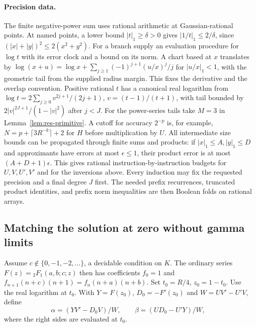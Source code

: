 \paragraph{Precision data.}
The finite negative-power sum uses rational arithmetic at Gaussian-rational
points. At named points, a lower bound $|t|_1\ge\delta>0$ gives
$|1/t|_1\le 2/\delta$, since $(|x|+|y|)^2\le 2(x^2+y^2)$.
For a branch supply an evaluation procedure for $\log t$ with its error
clock and a bound on its norm. A chart based at $x$ translates by
$\log(x+u)=\log x+\sum_{j\ge1}(-1)^{j+1}(u/x)^j/j$ for $|u/x|_1<1$,
with the geometric tail from the supplied radius margin. This fixes the
derivative and the overlap convention. Positive rational $t$ has a canonical real logarithm from
$\log t=2\sum_{j\ge0} v^{2j+1}/(2j+1)$, $v=(t-1)/(t+1)$, with tail
bounded by $2|v|^{2J+1}/(1-|v|^2)$ after $j<J$.
For the power-series tails take $M=3$ in Lemma~\ref{lem:res-primitive}.
A cutoff for accuracy $2^{-p}$ is, for example,
$N=p+\lceil 3 R^{-k}\rceil+2$ for $H$ before multiplication by $U$.
All intermediate size bounds can be propagated through finite sums and
products: if $|x|_1\le A, |y|_1\le D$ and approximants have errors
at most $\epsilon\le1$, their product error is at most
$(A+D+1)\epsilon$. This gives rational instruction-by-instruction budgets
for $U,V,U',V'$ and for the inversions above. Every induction may fix the
requested precision and a final degree $J$ first. The needed prefix
recurrences, truncated product identities, and prefix norm inequalities
are then Boolean folds on rational arrays.

\subsection{Matching the solution at zero without gamma limits}
Assume $c\notin\{0,-1,-2,\ldots\}$, a decidable condition on $K$. The
ordinary series $F(z)={}_2F_1(a,b;c;z)$ then has coefficients
$f_0=1$ and $f_{n+1}(n+c)(n+1)=f_n(n+a)(n+b)$.
Set $t_0=R/4$, $z_0=1-t_0$. Use the real logarithm at $t_0$.
With $Y=F(z_0)$, $D_0=-F'(z_0)$ and $W=UV'-U'V$, define
\[
 \alpha=(YV'-D_0 V)/W,\qquad \beta=(U D_0-U'Y)/W ,
\]
where the right sides are evaluated at $t_0$.

